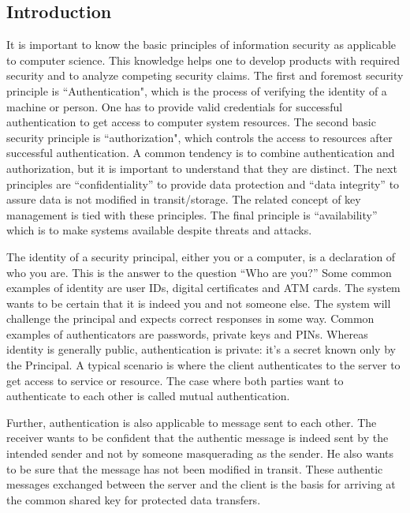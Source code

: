 \begin{multicols}{2}
\section*{Introduction}

It is important to know the basic principles of information security as applicable to computer science. This knowledge helps one to develop products with required security and to analyze competing security claims. The first and foremost security principle is ``Authentication", which is the process of verifying the identity of a machine or person. One has to provide valid credentials for successful authentication to get access to computer system resources. The second basic security principle is ``authorization", which controls the access to resources after successful authentication. A common tendency is to combine authentication and authorization, but it is important to understand that they are distinct. The next principles are ``confidentiality'' to provide data protection and ``data integrity'' to assure data is not modified in transit/storage. The related concept of key management is tied with these principles. The final principle is ``availability'' which is to make systems available despite threats and attacks.

The identity of a security principal, either you or a computer, is a declaration of who you are. This is the answer to the question ``Who are you?'' Some common examples of identity are user IDs, digital certificates and ATM cards. The system wants to be certain that it is indeed you and not someone else. The system will challenge the principal and expects correct responses in some way. Common examples of authenticators are passwords, private keys and PINs. Whereas identity is generally public, authentication is private: it's a secret known only by the Principal. A typical scenario is where the client authenticates to the server to get access to service or resource. The case where both parties want to authenticate to each other is called mutual authentication. 

\smallskip

Further, authentication is also applicable to message sent to each other. The receiver wants to be confident that the authentic message is indeed sent by the intended sender and not by someone masquerading as the sender. He also wants to be sure that the message has not been modified in transit. These authentic messages exchanged between the server and the client is the basis for arriving at the common shared key for protected data transfers.


\end{multicols}

